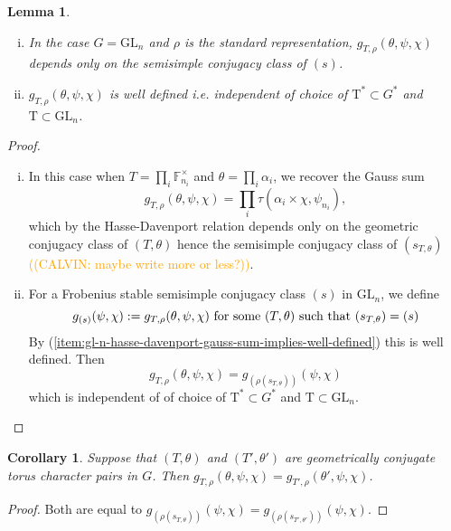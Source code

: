 \documentclass[12pt, reqno]{amsart}
\newtheorem{lemma}[theorem]{Lemma}
\newtheorem{corollary}[theorem]{Corollary}
\theoremstyle{definition}
\theoremstyle{definition}
\theoremstyle{definition}
\newcommand{\multiplicativegroup}[1]{#1^{\times}}
\newcommand{\fieldCharacter}{\psi}
\newcommand{\GL}{\mathrm{GL}}
\newcommand{\finiteField}{\mathbb{F}}
\newcommand{\finiteFieldExtension}[1]{\finiteField_{#1}}
\newcommand{\algebraicGroup}[1]{\boldsymbol{\mathrm{#1}}}
\newcommand{\calvin}[1]{\textcolor{orange}{\sffamily ((CALVIN: #1))}}
\begin{document}
\begin{lemma}
\label{lemma:gl_invariance}
\begin{enumerate}[(i)]
	\item \label{item:gl-n-hasse-davenport-gauss-sum-implies-well-defined} In the case $G = \GL_n$ and $\rho$ is the standard representation, $g_{T,\rho}(\theta,\psi,\chi)$ depends only on the semisimple conjugacy class of $(s)$.
	\item $g_{T,\rho}(\theta,\psi,\chi)$ is well defined i.e. independent of choice of $\algebraicGroup{T}^* \subset G^*$ and $\algebraicGroup{T} \subset \GL_n$.
\end{enumerate}
\end{lemma}
\begin{proof}
\begin{enumerate}[(i)]
	\item In this case when $T = \prod_{i} \multiplicativegroup{\finiteFieldExtension{n_i}}$ and $\theta = \prod_{i} \alpha_i$, we recover the Gauss sum
	\[
	g_{T,\rho}(\theta,\psi,\chi)  = \prod_i \tau(\alpha_i \times \chi, \fieldCharacter_{n_i}),
	\]
	which by the Hasse-Davenport relation depends only on the geometric conjugacy class of $(T,\theta)$ hence the semisimple conjugacy class of $(s_{T,\theta})$ \calvin{maybe write more or less?}. 
	\item For a Frobenius stable semisimple conjugacy class $(s)$ in $\GL_n$, we define
	\[
	g_{(s)}(\psi,\chi) := g_{T,\rho}(\theta,\psi,\chi) \textnormal{ for some } (T,\theta) \textnormal{ such that } (s_{T,\theta}) = (s)
	\]
	By (\ref{item:gl-n-hasse-davenport-gauss-sum-implies-well-defined}) this is well defined. Then
	\[
	g_{T,\rho}(\theta,\psi,\chi)  = g_{(\rho(s_{T,\theta}))}(\psi,\chi)
	\]
	which is independent of of choice of $\algebraicGroup{T}^* \subset G^*$ and $\algebraicGroup{T} \subset \GL_n$.
\end{enumerate}
\end{proof}

\begin{corollary}
\label{cor:geoconj}
Suppose that $(T,\theta)$ and $(T',\theta')$ are geometrically conjugate torus character pairs in $G$. Then $g_{T,\rho}(\theta,\psi,\chi) = g_{T',\rho}(\theta',\psi,\chi)$.
\end{corollary}
\begin{proof}
Both are equal to $g_{(\rho(s_{T,\theta}))}(\psi,\chi) = g_{(\rho(s_{T',\theta'}))}(\psi,\chi)$.
\end{proof}
\end{document}
